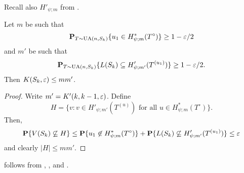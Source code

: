 Recall also $H'_{\psi; m}$ from .
\begin{prop}
  Let $m$ be such that
  \[
    \operatorname{\mathbf{P}}_{T \sim \operatorname{UA}(n, S_k)}\{u_1 \in H^*_{\psi; m}(T^\circ)\} \ge 1 - \varepsilon/2 
  \]
  and $m'$ be such that
  \[
    \operatorname{\mathbf{P}}_{T \sim \operatorname{UA}(n, S_k)} \{ L(S_k) \subseteq H'_{\psi;
      m'}(T^{(u_1)})\} \ge 1 - \varepsilon/2 .
  \]
  Then $K(S_k, \varepsilon) \le m m'$.
\end{prop}
\begin{proof}
  Write $m' = K'(k, k - 1, \varepsilon)$. Define
  \[
    H = \{v \colon v \in H'_{\psi; m'}(T^{(u)}) \text{ for all } u \in H^*_{\psi; m}(T^\circ)\} .
  \]
  Then,
  \[
    \operatorname{\mathbf{P}}\{ V(S_k) \not\subseteq H \} \le \operatorname{\mathbf{P}}\{u_1 \not\in H^*_{\psi; m}(T^\circ)\} + \operatorname{\mathbf{P}}\{L(S_k) \not\subseteq H'_{\psi; m'}(T^{(u_1)})\} \le \varepsilon 
  \]
  and clearly $|H| \le m m'$.
\end{proof}
 follows from ,
, and .

